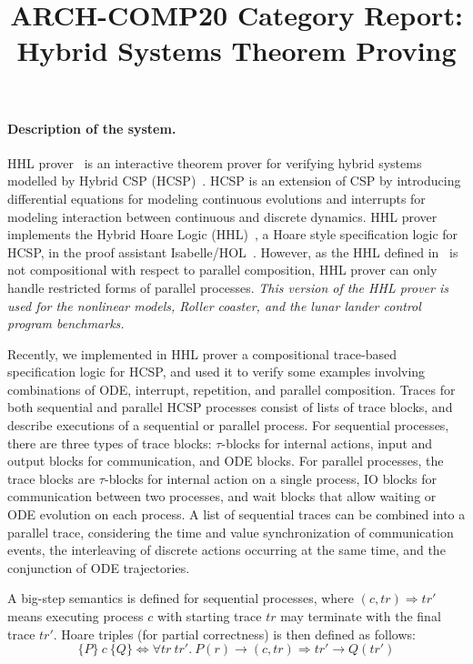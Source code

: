 \documentclass[runningheads,a4paper]{llncs}
\begin{document}
\author{}
\institute{}

\title{ARCH-COMP20 Category Report: Hybrid Systems Theorem Proving}

\maketitle

\paragraph{Description of the system.}

HHL prover~\cite{WZZ15} is an interactive theorem prover for verifying
hybrid systems modelled by Hybrid CSP (HCSP)~\cite{He94,ZWR96}. HCSP is an extension of CSP by introducing differential equations for modeling continuous evolutions and interrupts for modeling interaction between continuous and discrete dynamics.  HHL prover implements the Hybrid Hoare Logic (HHL)~\cite{LLQZ10}, a Hoare style specification logic for HCSP, in the proof assistant Isabelle/HOL~\cite{isabelle}. However, as the HHL defined in~\cite{LLQZ10} is not compositional with respect to 
parallel composition, HHL prover can only handle restricted forms of parallel processes. \emph{This version of the HHL prover is used for the nonlinear models, Roller coaster, and the lunar lander control program benchmarks.}

Recently, we implemented in HHL prover a compositional trace-based specification logic for HCSP, and used it to verify some examples involving combinations of ODE, interrupt, repetition, and parallel composition. Traces for both sequential and parallel HCSP processes consist of lists of trace blocks, and describe executions of a sequential or parallel process. For sequential processes, there are three types of trace blocks: $\tau$-blocks for internal actions, input and output blocks for communication, and ODE blocks. For parallel processes, the trace blocks are $\tau$-blocks for internal action on a single process, IO blocks for communication between two processes, and wait blocks that allow waiting or ODE evolution on each process. A list of sequential traces can be combined into a parallel trace, considering the time and value synchronization of communication events, the interleaving of discrete actions occurring at the same time, and the conjunction of ODE trajectories.

A big-step semantics is defined for sequential processes, where $(c,tr)\Rightarrow tr'$ means executing process $c$ with starting trace $tr$ may terminate with the final trace $tr'$. Hoare triples (for partial correctness) is then defined as follows:
\[\{P\}~ c ~\{Q\} \Longleftrightarrow \forall tr\ tr'.\ P(r) \longrightarrow (c,tr)\Rightarrow tr' \longrightarrow Q(tr') \]
\end{document}
